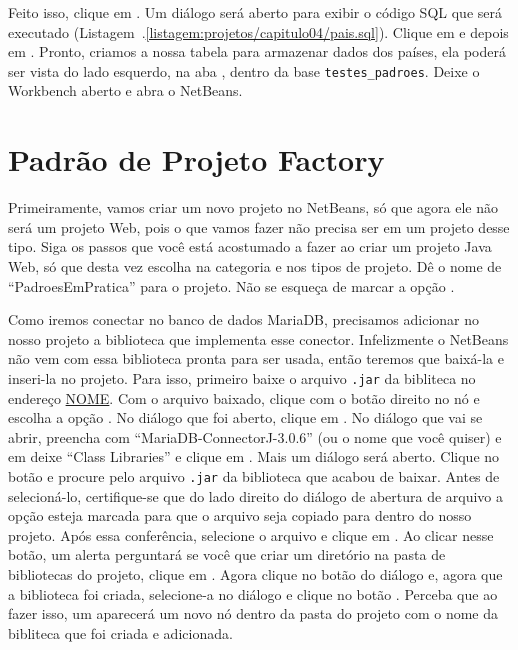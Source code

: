 Feito isso, clique em . Um diálogo será aberto para exibir o código SQL que será executado (Listagem~\thechapter.\ref{listagem:projetos/capitulo04/pais.sql}). Clique em  e depois em . Pronto, criamos a nossa tabela para armazenar dados dos países, ela poderá ser vista do lado esquerdo, na aba , dentro da base \texttt{testes\_padroes}. Deixe o Workbench aberto e abra o NetBeans. 


\section{Padrão de Projeto Factory}

Primeiramente, vamos criar um novo projeto no NetBeans, só que agora ele não será um projeto Web, pois o que vamos fazer não precisa ser em um projeto desse tipo. Siga os passos que você está acostumado a fazer ao criar um projeto Java Web, só que desta vez escolha  na categoria e  nos tipos de projeto. Dê o nome de ``PadroesEmPratica'' para o projeto. Não se esqueça de marcar a opção .

Como iremos conectar no banco de dados MariaDB, precisamos adicionar no nosso projeto a biblioteca que implementa esse conector. Infelizmente o NetBeans não vem com essa biblioteca pronta para ser usada, então teremos que baixá-la e inseri-la no projeto. Para isso, primeiro baixe o arquivo \texttt{.jar} da bibliteca no endereço \url{NOME}. Com o arquivo baixado, clique com o botão direito no nó  e escolha a opção . No diálogo que foi aberto, clique em . No diálogo que vai se abrir, preencha  com ``MariaDB-ConnectorJ-3.0.6'' (ou o nome que você quiser) e em  deixe ``Class Libraries'' e clique em . Mais um diálogo será aberto. Clique no botão  e procure pelo arquivo \texttt{.jar} da biblioteca que acabou de baixar. Antes de selecioná-lo, certifique-se que do lado direito do diálogo de abertura de arquivo a opção  esteja marcada para que o arquivo seja copiado para dentro do nosso projeto. Após essa conferência, selecione o arquivo e clique em . Ao clicar nesse botão, um alerta perguntará se você que criar um diretório na pasta de bibliotecas do projeto, clique em . Agora clique no botão  do diálogo  e, agora que a biblioteca foi criada, selecione-a no diálogo  e clique no botão . Perceba que ao fazer isso, um aparecerá um novo nó dentro da pasta  do projeto com o nome da bibliteca que foi criada e adicionada.

